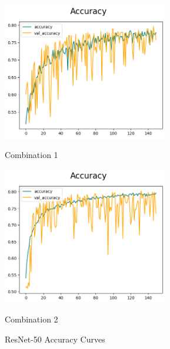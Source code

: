 \begin{figure}[H]
    \centering
    \begin{minipage}[b]{0.49\textwidth}
        \centering
        \includegraphics[width=\textwidth, height=6cm]{Figures/balanced_data/less_data/withoutbn/resnet/accuracy.png}
        \captionsetup{labelformat=empty}
        \caption{Combination 1}
        \label{fig:u_wo_r_a}
    \end{minipage}
    \hfill
    \begin{minipage}[b]{0.49\textwidth}
        \centering
        \includegraphics[width=\textwidth, height=6cm]{Figures/balanced_data/less_data/withbn/resnet/accuracy.png}
        \captionsetup{labelformat=empty}
        \caption{Combination 2}
        \label{fig:u_w_r_a}
    \end{minipage}
    \captionsetup{labelformat=default}
    \caption{ResNet-50 Accuracy Curves}
\end{figure}


